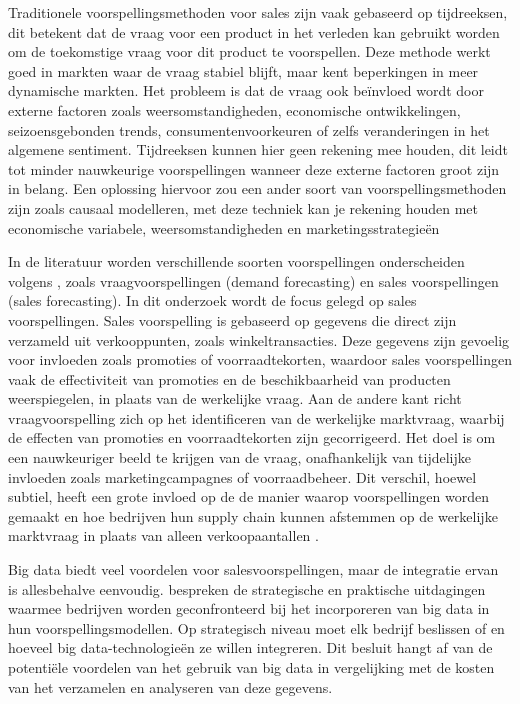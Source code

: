 Traditionele voorspellingsmethoden voor sales zijn vaak gebaseerd op tijdreeksen, dit betekent dat de vraag voor een product in het verleden kan gebruikt worden om de toekomstige vraag voor dit product te voorspellen. Deze methode werkt goed in markten waar de vraag stabiel blijft, maar kent beperkingen in meer dynamische markten. Het probleem is dat de vraag ook beïnvloed wordt door externe factoren zoals weersomstandigheden, economische ontwikkelingen, seizoensgebonden trends, consumentenvoorkeuren of zelfs veranderingen in het algemene sentiment. Tijdreeksen kunnen hier geen rekening mee houden, dit leidt tot minder nauwkeurige voorspellingen wanneer deze externe factoren groot zijn in belang. Een oplossing hiervoor zou een ander soort van voorspellingsmethoden zijn zoals causaal modelleren, met deze techniek kan je rekening houden met economische variabele, weersomstandigheden en marketingsstrategieën \autocite{UsugaCadavid2018}

In de literatuur worden verschillende soorten voorspellingen onderscheiden volgens \textcite{UsugaCadavid2018}, zoals vraagvoorspellingen (demand forecasting) en sales voorspellingen (sales forecasting). In dit onderzoek wordt de focus gelegd op sales voorspellingen. Sales voorspelling is gebaseerd op gegevens die direct zijn verzameld uit verkooppunten, zoals winkeltransacties. Deze gegevens zijn gevoelig voor invloeden zoals promoties of voorraadtekorten, waardoor sales voorspellingen vaak de effectiviteit van promoties en de beschikbaarheid van producten weerspiegelen, in plaats van de werkelijke vraag. Aan de andere kant richt vraagvoorspelling zich op het identificeren van de werkelijke marktvraag, waarbij de effecten van promoties en voorraadtekorten zijn gecorrigeerd. Het doel is om een nauwkeuriger beeld te krijgen van de vraag, onafhankelijk van tijdelijke invloeden zoals marketingcampagnes of voorraadbeheer. Dit verschil, hoewel subtiel, heeft een grote invloed op de de manier waarop voorspellingen worden gemaakt en hoe bedrijven hun supply chain kunnen afstemmen op de werkelijke marktvraag in plaats van alleen verkoopaantallen .

Big data biedt veel voordelen voor salesvoorspellingen, maar de integratie ervan is allesbehalve eenvoudig. \textcite{Boone2019} bespreken de strategische en praktische uitdagingen waarmee bedrijven worden geconfronteerd bij het incorporeren van big data in hun voorspellingsmodellen. Op strategisch niveau moet elk bedrijf beslissen of en hoeveel big data-technologieën ze willen integreren. Dit besluit hangt af van de potentiële voordelen van het gebruik van big data in vergelijking met de kosten van het verzamelen en analyseren van deze gegevens. 

